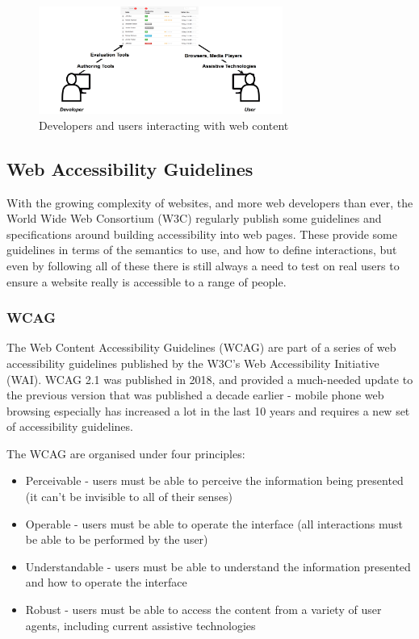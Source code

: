 \documentclass[ %
                    author={Aleena Baig},
                supervisor={Dr Simon Lock},
                    degree={BSc},
                     title={On Making Web Accessible Graphs},
                  subtitle={},
                      year={2019} ]{dissertation}
\begin{document}
\begin{figure}[h]
\includegraphics[width=8cm]{images/W3Components-v2.png}
\centering
\caption{Developers and users interacting with web content}
\end{figure}

\subsection{Web Accessibility Guidelines}
With the growing complexity of websites, and more web developers than ever, the World Wide Web Consortium (W3C) regularly publish some guidelines and specifications around building accessibility into web pages.
These provide some guidelines in terms of the semantics to use, and how to define interactions, but even by following all of these there is still always a need to test on real users to ensure a website really is accessible to a range of people.

\subsubsection{WCAG}

The Web Content Accessibility Guidelines (WCAG) are part of a series of web accessibility guidelines published by the W3C's Web Accessibility Initiative (WAI). WCAG 2.1 was published in 2018, and provided a much-needed update to the previous version that was published a decade earlier - mobile phone web browsing especially has increased a lot in the last 10 years and requires a new set of accessibility guidelines.

The WCAG are organised under four principles:

\begin{itemize}
    \item Perceivable - users must be able to perceive the information being presented (it can't be invisible to all of their senses)
    \item Operable - users must be able to operate the interface (all interactions must be able to be performed by the user)
    \item Understandable - users must be able to understand the information presented and how to operate the interface
    \item Robust - users must be able to access the content from a variety of user agents, including current assistive technologies
\end{itemize}
\end{document}
